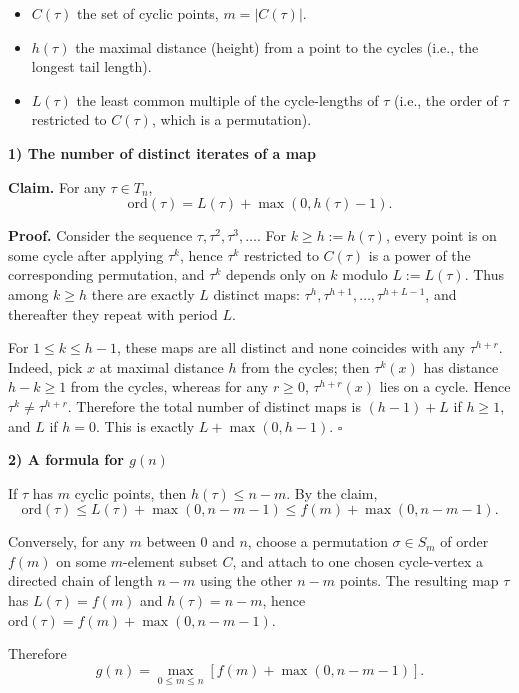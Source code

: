 \documentclass[12pt,a4paper]{article}
\theoremstyle{definition}
\begin{document}
    \begin{itemize}
        \item $C(\tau)$ the set of cyclic points, $m = |C(\tau)|$.
        \item $h(\tau)$ the maximal distance (height) from a point to the cycles (i.e., the longest tail length).
        \item $L(\tau)$ the least common multiple of the cycle-lengths of $\tau$ (i.e., the order of $\tau$ restricted to $C(\tau)$, which is a permutation).
    \end{itemize}

    \textbf{1) The number of distinct iterates of a map}

    \textbf{Claim.} For any $\tau \in T_n$,
    $$\text{ord}(\tau) = L(\tau) + \max(0, h(\tau) - 1).$$

    \textbf{Proof.} Consider the sequence $\tau, \tau^2, \tau^3, \ldots$. For $k \geq h := h(\tau)$, every point is on some cycle after applying $\tau^k$, hence $\tau^k$ restricted to $C(\tau)$ is a power of the corresponding permutation, and $\tau^k$ depends only on $k$ modulo $L := L(\tau)$. Thus among $k \geq h$ there are exactly $L$ distinct maps: $\tau^h, \tau^{h+1}, \ldots, \tau^{h+L-1}$, and thereafter they repeat with period $L$.

    For $1 \leq k \leq h - 1$, these maps are all distinct and none coincides with any $\tau^{h+r}$. Indeed, pick $x$ at maximal distance $h$ from the cycles; then $\tau^k(x)$ has distance $h - k \geq 1$ from the cycles, whereas for any $r \geq 0$, $\tau^{h+r}(x)$ lies on a cycle. Hence $\tau^k \neq \tau^{h+r}$. Therefore the total number of distinct maps is $(h - 1) + L$ if $h \geq 1$, and $L$ if $h = 0$. This is exactly $L + \max(0, h - 1)$. $\square$

    \textbf{2) A formula for $g(n)$}

    If $\tau$ has $m$ cyclic points, then $h(\tau) \leq n - m$. By the claim,
    $$\text{ord}(\tau) \leq L(\tau) + \max(0, n - m - 1) \leq f(m) + \max(0, n - m - 1).$$

    Conversely, for any $m$ between $0$ and $n$, choose a permutation $\sigma \in S_m$ of order $f(m)$ on some $m$-element subset $C$, and attach to one chosen cycle-vertex a directed chain of length $n - m$ using the other $n - m$ points. The resulting map $\tau$ has $L(\tau) = f(m)$ and $h(\tau) = n - m$, hence $\text{ord}(\tau) = f(m) + \max(0, n - m - 1)$.

    Therefore
    $$g(n) = \max_{0 \leq m \leq n} \left[ f(m) + \max(0, n - m - 1) \right].$$
\end{document}
